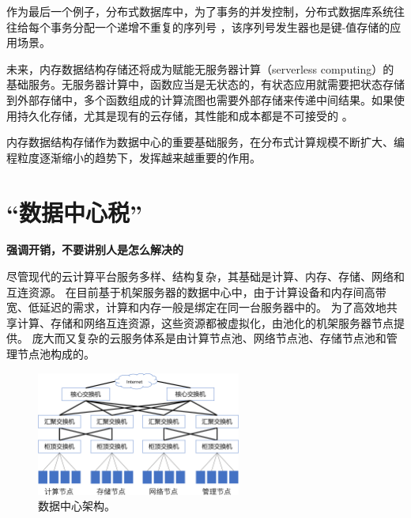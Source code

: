 作为最后一个例子，分布式数据库中，为了事务的并发控制，分布式数据库系统往往给每个事务分配一个递增不重复的序列号 \cite{li2017eris}，该序列号发生器也是键-值存储的应用场景。

未来，内存数据结构存储还将成为赋能无服务器计算（serverless computing）的基础服务。无服务器计算中，函数应当是无状态的，有状态应用就需要把状态存储到外部存储中，多个函数组成的计算流图也需要外部存储来传递中间结果。如果使用持久化存储，尤其是现有的云存储，其性能和成本都是不可接受的 \cite{jonas2019cloud}。


内存数据结构存储作为数据中心的重要基础服务，在分布式计算规模不断扩大、编程粒度逐渐缩小的趋势下，发挥越来越重要的作用。
\fi


\section{``数据中心税''}

\textbf{强调开销，不要讲别人是怎么解决的}

尽管现代的云计算平台服务多样、结构复杂，其基础是计算、内存、存储、网络和互连资源。
在目前基于机架服务器的数据中心中，由于计算设备和内存间高带宽、低延迟的需求，计算和内存一般是绑定在同一台服务器中的。
为了高效地共享计算、存储和网络互连资源，这些资源都被虚拟化，由池化的机架服务器节点提供。
庞大而又复杂的云服务体系是由计算节点池、网络节点池、存储节点池和管理节点池构成的。

\begin{figure}[htbp]
	\centering
	\includegraphics[width=0.6\textwidth]{figures/DC_arch.pdf}
	\caption{数据中心架构。}
	\label{background:fig:cloud-architecture}
\end{figure}

